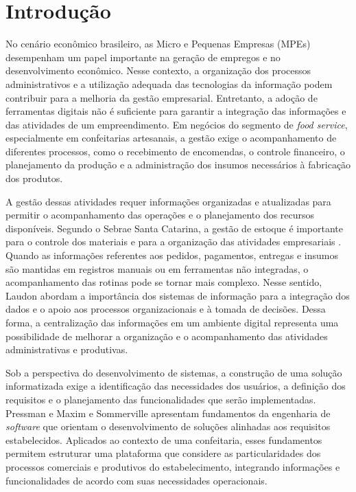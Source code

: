 \chapter{Introdução}

No cenário econômico brasileiro, as Micro e Pequenas Empresas (MPEs) desempenham um papel importante na geração de empregos e no desenvolvimento econômico. Nesse contexto, a organização dos processos administrativos e a utilização adequada das tecnologias da informação podem contribuir para a melhoria da gestão empresarial. Entretanto, a adoção de ferramentas digitais não é suficiente para garantir a integração das informações e das atividades de um empreendimento. Em negócios do segmento de \textit{food service}, especialmente em confeitarias artesanais, a gestão exige o acompanhamento de diferentes processos, como o recebimento de encomendas, o controle financeiro, o planejamento da produção e a administração dos insumos necessários à fabricação dos produtos.

A gestão dessas atividades requer informações organizadas e atualizadas para permitir o acompanhamento das operações e o planejamento dos recursos disponíveis. Segundo o Sebrae Santa Catarina, a gestão de estoque é importante para o controle dos materiais e para a organização das atividades empresariais \cite{sebrae_sc2025}. Quando as informações referentes aos pedidos, pagamentos, entregas e insumos são mantidas em registros manuais ou em ferramentas não integradas, o acompanhamento das rotinas pode se tornar mais complexo. Nesse sentido, Laudon \cite{laudon2014} abordam a importância dos sistemas de informação para a integração dos dados e o apoio aos processos organizacionais e à tomada de decisões. Dessa forma, a centralização das informações em um ambiente digital representa uma possibilidade de melhorar a organização e o acompanhamento das atividades administrativas e produtivas.

Sob a perspectiva do desenvolvimento de sistemas, a construção de uma solução informatizada exige a identificação das necessidades dos usuários, a definição dos requisitos e o planejamento das funcionalidades que serão implementadas. Pressman e Maxim \cite{pressman2021} e Sommerville \cite{sommerville2019} apresentam fundamentos da engenharia de \textit{software} que orientam o desenvolvimento de soluções alinhadas aos requisitos estabelecidos. Aplicados ao contexto de uma confeitaria, esses fundamentos permitem estruturar uma plataforma que considere as particularidades dos processos comerciais e produtivos do estabelecimento, integrando informações e funcionalidades de acordo com suas necessidades operacionais.

